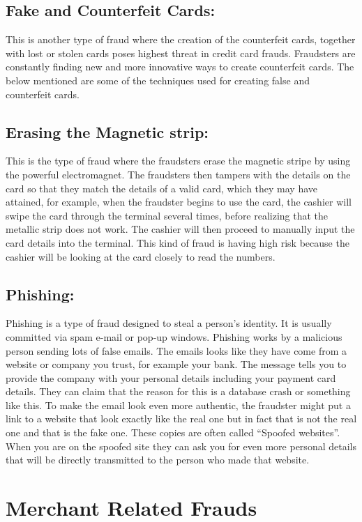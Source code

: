 \documentclass{report}
\begin{document}
\subsection{Fake and Counterfeit Cards:}
This is another type of fraud where the creation of the counterfeit cards, together with lost or stolen cards poses highest threat in credit card frauds. Fraudsters are constantly finding new and more innovative ways to create counterfeit cards. The below mentioned are some of the techniques used for creating false and counterfeit cards.  

\subsection{Erasing the Magnetic strip:}
This is the type of fraud where the fraudsters erase the magnetic stripe by using the powerful electromagnet. The fraudsters then tampers with the details on the card so that they match the details of a valid card, which they may have attained, for example, when the fraudster begins to use the card, the cashier will swipe the card through the terminal several times, before realizing that the metallic strip does not work. The cashier will then proceed to manually input the card details into the terminal. This kind of fraud is having high risk because the cashier will be looking at the card closely to read the numbers.

\subsection{Phishing:}
Phishing is a type of fraud designed to steal a person’s identity. It is usually committed via spam e-mail or pop-up windows. Phishing works by a malicious person sending lots of false emails. The emails looks like they have come from a website or company you trust, for example your bank. The message tells you to provide the company with your personal details including your payment card details. They can claim that the reason for this is a database crash or something like this. To make the email look even more authentic, the fraudster might put a link to a website that look exactly like the real one but in fact that is not the real one and that is the fake one. These copies are often called “Spoofed websites”. When you are on the spoofed site they can ask you for even more personal details that will be directly transmitted to the person who made that website.  

\section{Merchant Related Frauds}
\end{document}
